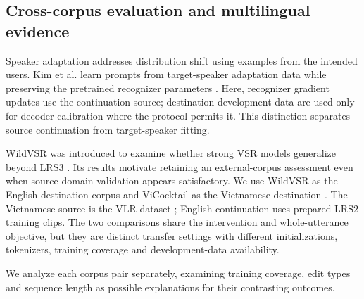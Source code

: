 \subsection{Cross-corpus evaluation and multilingual evidence}
Speaker adaptation addresses distribution shift using examples from the intended
users. Kim et al. learn prompts from target-speaker adaptation data while
preserving the pretrained recognizer parameters \cite{kim2025prompt}. Here,
recognizer gradient updates use the continuation source; destination development
data are used only for decoder calibration where the protocol permits it.
This distinction separates source continuation from target-speaker fitting.

WildVSR was introduced to examine whether strong VSR models generalize beyond
LRS3 \cite{djilali2024wildvsr}. Its results motivate retaining an external-corpus
assessment even when source-domain validation appears satisfactory. We use WildVSR
as the English destination corpus and ViCocktail as the Vietnamese destination
\cite{nguyen2025vicocktail}. The Vietnamese source is the VLR dataset
\cite{vlr2026dataset}; English continuation uses prepared LRS2 training clips.
The two comparisons share the intervention and whole-utterance objective, but
they are distinct transfer settings with different initializations, tokenizers,
training coverage and development-data availability.

We analyze each corpus pair separately, examining training coverage, edit types
and sequence length as possible explanations for their contrasting outcomes.
